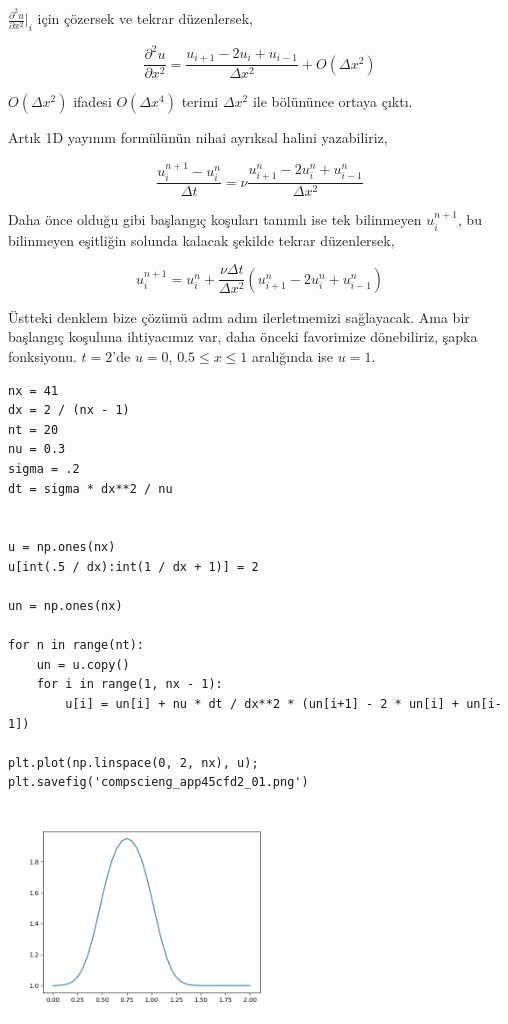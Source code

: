 \documentclass[12pt,fleqn]{article}\usepackage{../../common}
\begin{document}
$\frac{\partial ^2 u}{\partial x^2}\bigg|_i$ için çözersek ve tekrar düzenlersek,

$$
\frac{\partial ^2 u}{\partial x^2}=\frac{u_{i+1}-2u_{i}+u_{i-1}}{\Delta x^2} + O(\Delta x^2)
$$

$O(\Delta x^2)$ ifadesi $O(\Delta x^4)$ terimi $\Delta x^2$ ile bölününce ortaya çıktı.

Artık 1D yayınım formülünün nihai ayrıksal halini yazabiliriz,

$$
\frac{u_{i}^{n+1}-u_{i}^{n}}{\Delta t} =
\nu\frac{u_{i+1}^{n}-2u_{i}^{n}+u_{i-1}^{n}}{\Delta x^2}
$$

Daha önce olduğu gibi başlangıç koşuları tanımlı ise tek bilinmeyen
$u_{i}^{n+1}$, bu bilinmeyen eşitliğin solunda kalacak şekilde tekrar
düzenlersek,


$$
u_{i}^{n+1} =
u_{i}^{n}+\frac{\nu\Delta t}{\Delta x^2}(u_{i+1}^{n}-2u_{i}^{n}+u_{i-1}^{n})
$$

Üstteki denklem bize çözümü adım adım ilerletmemizi sağlayacak. Ama bir
başlangıç koşuluna ihtiyacımız var, daha önceki favorimize dönebiliriz, şapka
fonksiyonu. $t=2$'de $u=0$, $0.5\le x\le 1$ aralığında ise $u=1$. 

\begin{verbatim}
nx = 41
dx = 2 / (nx - 1)
nt = 20 
nu = 0.3 
sigma = .2 
dt = sigma * dx**2 / nu 


u = np.ones(nx)     
u[int(.5 / dx):int(1 / dx + 1)] = 2 

un = np.ones(nx)

for n in range(nt): 
    un = u.copy() 
    for i in range(1, nx - 1):
        u[i] = un[i] + nu * dt / dx**2 * (un[i+1] - 2 * un[i] + un[i-1])
        
plt.plot(np.linspace(0, 2, nx), u);
plt.savefig('compscieng_app45cfd2_01.png')
\end{verbatim}

\includegraphics[width=20em]{compscieng_app45cfd2_01.png}
\end{document}
